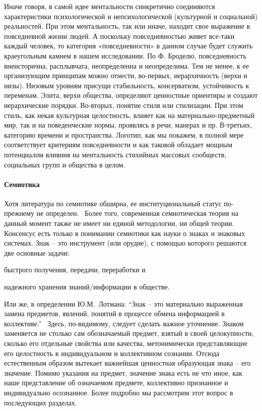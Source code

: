 Иначе говоря, в самой идее ментальности синкретично соединяются характеристики психологической и непсихологической (культурной и социальной) реальностей. При этом ментальность, так или иначе, находит свое выражение в повседневной жизни людей. А поскольку повседневностью живет все-таки каждый человек, то категория «повседневности» в данном случае будет служить краеугольным камнем в нашем исследовании. По Ф. Броделю, повседневность внеисторична, расплывчата, неопределенна и неопределима. Тем не менее, к ее организующим принципам можно отнести, во-первых, иерархичность (верхи и низы). Низовым уровням присущи стабильность, консерватизм, устойчивость к переменам. Элита, верхи общества, определяют ценностные ориентиры и создают иерархические порядки. Во-вторых, понятие стиля или стилизации. При этом стиль, как некая культурная целостность, влияет как на материально-предметный мир, так и на поведенческие нормы, проявлясь в речи, манерах и пр. В-третьих, категорию времени и пространства. Логотип, как мы покажем, в полной мере соответствует критериям повседневности и как таковой обладает мощным потенциалом влияния на ментальность стихийных массовых сообществ, социальных групп и общества в целом.

\paragraph{Семиотика}\label{1.1.3}

Хотя литература по семиотике обширна, ее институциональный статус по-прежнему не определен.~\autocite{sirotkin}
Более того, современная семиотическая теория на данный момент также не имеет ни
единой методологии, ни общей теории.~\autocites{gorny}{gasparov} Консенсус есть только в понимании семиотики как науки о знаках и знаковых системах. Знак -- это инструмент (или орудие),
с помощью которого решаются две основные задачи:
\begin{inparaenum}[\itshape 1\upshape)]
    \item быстрого получения, передачи, переработки и
    \item надежного хранения знаний/информации в обществе.
\end{inparaenum} Или же, в определении Ю.М.~Лотмана: ``Знак -- это материально выраженная замена предметов, явлений, понятий в процессе обмена информацией в коллективе.''~\autocite{wiki:symbol}
Здесь, по-видимому, следует сделать важное уточнение. Знаком заменяется не столько сам
обозначаемый предмет, взятый в своей целокупности, сколько его отдельные свойства или
качества, метонимически представляющие его целостность в индивидуальном и коллективном сознании. Отсюда естественным образом вытекает важнейшая ценностная образующая знака -- его значение. Помимо указания на предмет, значение знака есть не что иное, как наше представление об означаемом предмете, коллективно признанное и индивидуально осознанное. Более подробно мы рассмотрим этот вопрос в последующих разделах.

